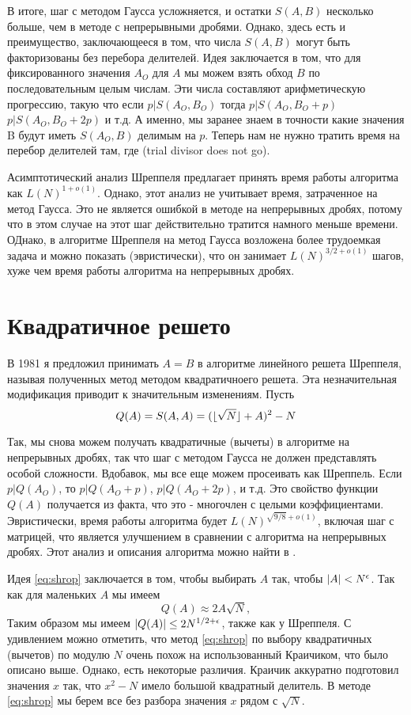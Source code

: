 \documentclass[a4paper,12pt]{report}
\DeclarePairedDelimiter\floor{\lfloor}{\rfloor}
\DeclarePairedDelimiter\abs{\lvert}{\rvert}%
\begin{document}
В итоге, шаг с методом Гаусса усложняется, и остатки $S(A, B)$ несколько больше, чем в методе с непрерывными дробями. Однако, здесь есть и преимущество, заключающееся в том, что числа $S(A,B)$ могут быть факторизованы без перебора делителей. Идея заключается в том, что для фиксированного значения $A_O$ для $A$ мы можем взять обход $B$ по последовательным целым числам. Эти числа составляют арифметическую прогрессию, такую что если $p|S(A_O, B_O)$ тогда $p|S(A_O, B_O + p)$ $p|S(A_O, B_O + 2p)$ и т.д. А именно, мы заранее знаем в точности какие значения B будут иметь $S(A_O, B)$ делимым на $p$. Теперь нам не нужно тратить время на перебор делителей там, где (trial divisor does not go).

Асимптотический анализ Шреппеля предлагает принять время работы алгоритма как $L(N)^{1+o(1)}$. Однако, этот анализ не учитывает время, затраченное на метод Гаусса. Это не является ошибкой в методе на непрерывных дробях, потому что в этом случае на этот шаг действительно тратится намного меньше времени. ОДнако, в алгоритме Шреппеля на метод Гаусса возложена более трудоемкая задача и можно показать (эвристически), что он занимает $L(N)^{3/2 +o(1)}$ шагов, хуже чем время работы алгоритма на непрерывных дробях.

\section{Квадратичное решето}

В 1981 я предложил принимать $A = B$ в алгоритме линейного решета Шреппеля, называя полученных метод методом квадратичноего решета. Эта незначительная модификация приводит к значительным изменениям. Пусть
\begin{equation}\label{eq:shrop}
Q(A) = S(A,A) = (\floor{\sqrt{N}} + A)^2 -N
\end{equation}

Так, мы снова можем получать квадратичные (вычеты) в алгоритме на непрерывных дробях, так что шаг с методом Гаусса не должен представлять особой сложности. Вдобавок, мы все еще можем просеивать как Шреппель. Если $p | Q(A_O)$, то $p | Q(A_O + p)$, $p | Q(A_O + 2p)$, и т.д. Это свойство функции $Q(A)$ получается из факта, что это - многочлен с целыми коэффициентами. Эвристически, время работы алгоритма будет $L(N)^{\sqrt{9/8} + o(1)}$, включая шаг с матрицей, что является улучшением в сравнении с алгоритма на непрерывных дробях. Этот анализ и описания алгоритма можно найти в \cite{pomer}.

Идея \eqref{eq:shrop} заключается в том, чтобы выбирать $A$ так, чтобы $\abs{A} < N^{\epsilon}$. Так как для маленьких $A$ мы имеем
\begin{equation*}
Q(A) \approx 2A\sqrt{N},
\end{equation*}
Таким образом мы имеем $\abs{Q(A)} \leq 2N^{1/2 + \epsilon}$, также как у Шреппеля. С удивлением можно отметить, что метод \eqref{eq:shrop} по выбору квадратичных (вычетов) по модулю $N$ очень похож на использованный Краичиком, что было описано выше. Однако, есть некоторые различия. Краичик аккуратно подготовил значения $x$ так, что $x^2 - N$ имело большой квадратный делитель. В методе \eqref{eq:shrop} мы берем все без разбора значения $x$ рядом с $\sqrt{N}$.
\end{document}
